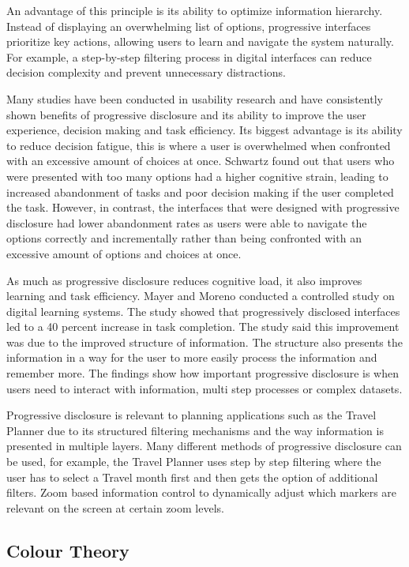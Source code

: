 \documentclass[]{project_final}
\begin{document}
An advantage of this principle is its ability to optimize information hierarchy. Instead of displaying an overwhelming list of options, progressive interfaces prioritize key actions, allowing users to learn and navigate the system naturally. For example, a step-by-step filtering process in digital interfaces can reduce decision complexity and prevent unnecessary distractions.

Many studies have been conducted in usability research and have consistently shown benefits of progressive disclosure and its ability to improve the user experience, decision making and task efficiency. Its biggest advantage is its ability to reduce decision fatigue, this is where a user is overwhelmed when confronted with an excessive amount of choices at once. Schwartz found out that users who were presented with too many options had a higher cognitive strain, leading to increased abandonment of tasks and poor decision making if the user completed the task. However, in contrast, the interfaces that were designed with progressive disclosure had lower abandonment rates as users were able to navigate the options correctly and incrementally rather than being confronted with an excessive amount of options and choices at once.

As much as progressive disclosure reduces cognitive load, it also improves learning and task efficiency. Mayer and Moreno conducted a controlled study on digital learning systems. The study showed that progressively disclosed interfaces led to a 40 percent increase in task completion. The study said this improvement was due to the improved structure of information. The structure also presents the information in a way for the user to more easily process the information and remember more. The findings show how important progressive disclosure is when users need to interact with information, multi step processes or complex datasets.

Progressive disclosure is relevant to planning applications such as the Travel Planner due to its structured filtering mechanisms and the way information is presented in multiple layers. Many different methods of progressive disclosure can be used, for example, the Travel Planner uses step by step filtering where the user has to select a Travel month first and then gets the option of additional filters. Zoom based information control to dynamically adjust which markers are relevant on the screen at certain zoom levels.\cite{springer_progressive_2019}

\subsection{Colour Theory}
\end{document}
